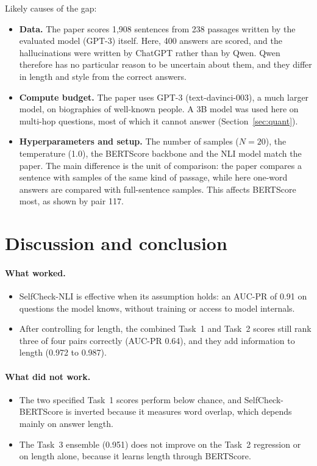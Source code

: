 \documentclass[11pt,a4paper]{article}
\begin{document}
Likely causes of the gap:
\begin{itemize}
  \item \textbf{Data.} The paper scores 1{,}908 sentences from 238 passages written by the
        evaluated model (GPT-3) itself. Here, 400 answers are scored, and the hallucinations were
        written by ChatGPT rather than by Qwen. Qwen therefore has no particular reason to be
        uncertain about them, and they differ in length and style from the correct answers.
  \item \textbf{Compute budget.} The paper uses GPT-3 (text-davinci-003), a much larger model, on
        biographies of well-known people. A 3B model was used here on multi-hop questions, most of
        which it cannot answer (Section~\ref{sec:quant}).
  \item \textbf{Hyperparameters and setup.} The number of samples ($N=20$), the temperature (1.0),
        the BERTScore backbone and the NLI model match the paper. The main difference is the unit
        of comparison: the paper compares a sentence with samples of the same kind of passage,
        while here one-word answers are compared with full-sentence samples. This affects BERTScore
        most, as shown by pair 117.
\end{itemize}

\section{Discussion and conclusion}

\paragraph{What worked.}
\begin{itemize}
  \item SelfCheck-NLI is effective when its assumption holds: an AUC-PR of 0.91 on questions the
        model knows, without training or access to model internals.
  \item After controlling for length, the combined Task~1 and Task~2 scores still rank three of
        four pairs correctly (AUC-PR 0.64), and they add information to length (0.972 to 0.987).
\end{itemize}

\paragraph{What did not work.}
\begin{itemize}
  \item The two specified Task~1 scores perform below chance, and SelfCheck-BERTScore is inverted
        because it measures word overlap, which depends mainly on answer length.
  \item The Task~3 ensemble (0.951) does not improve on the Task~2 regression or on length alone,
        because it learns length through BERTScore.
\end{itemize}
\end{document}
